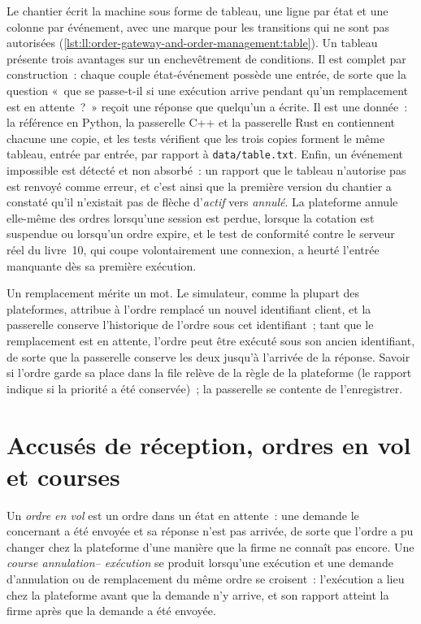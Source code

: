 Le chantier écrit la machine sous forme de tableau, une ligne par état et une colonne par événement, avec une marque pour les transitions qui
ne sont pas autorisées (\cref{lst:ll:order-gateway-and-order-management:table}). Un tableau présente trois avantages sur un enchevêtrement de
conditions. Il est complet par construction~: chaque couple état-événement possède une entrée, de sorte que la question «~que se passe-t-il si une exécution
arrive pendant qu'un remplacement est en attente~?~» reçoit une réponse que quelqu'un a écrite. Il est une donnée~: la référence en Python, la passerelle C++
et la passerelle Rust en contiennent chacune une copie, et les tests vérifient que les trois copies forment le même tableau, entrée par entrée,
par rapport à \texttt{data/table.txt}. Enfin, un événement impossible est détecté et non absorbé~: un rapport que le tableau n'autorise pas
est renvoyé comme erreur, et c'est ainsi que la première version du chantier a constaté qu'il n'existait pas de flèche d'\emph{actif} vers
\emph{annulé}. La plateforme annule elle-même des ordres lorsqu'une session est perdue, lorsque la cotation est suspendue ou lorsqu'un ordre expire, et
le test de conformité contre le serveur réel du livre~10, qui coupe volontairement une connexion, a heurté l'entrée manquante dès sa première exécution.

\label{lst:ll:order-gateway-and-order-management:table}

Un remplacement mérite un mot. Le simulateur, comme la plupart des plateformes, attribue à l'ordre remplacé un nouvel identifiant client, et la passerelle
conserve l'historique de l'ordre sous cet identifiant~; tant que le remplacement est en attente, l'ordre peut être exécuté sous son ancien identifiant, de sorte que la passerelle
conserve les deux jusqu'à l'arrivée de la réponse. Savoir si l'ordre garde sa place dans la file relève de la règle de la plateforme (le rapport indique
si la priorité a été conservée)~; la passerelle se contente de l'enregistrer.

\section{Accusés de réception, ordres en vol et courses}

\begin{definition}\label{def:ll:order-gateway-and-order-management:inflight}
Un \emph{ordre en vol} est un ordre dans un état en attente~: une demande le concernant a été envoyée et sa
réponse n'est pas arrivée, de sorte que l'ordre a pu changer chez la plateforme d'une manière que la firme ne connaît pas encore. Une \emph{course annulation--
exécution} se produit lorsqu'une exécution et une demande d'annulation ou de remplacement du même ordre se croisent~: l'exécution a lieu
chez la plateforme avant que la demande n'y arrive, et son rapport atteint la firme après que la demande a été envoyée.
\end{definition}


